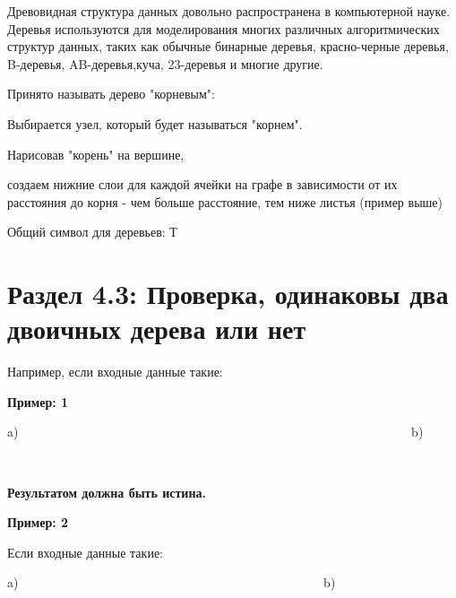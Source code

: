 \vspace{\baselineskip}
Древовидная структура данных довольно распространена в компьютерной науке. Деревья используются для моделирования многих различных алгоритмических структур данных, таких как обычные бинарные деревья, красно-черные деревья, B-деревья, AB-деревья,куча, 23-деревья и многие другие.

\vspace{\baselineskip}
Принято называть дерево "корневым":

\vspace{\baselineskip}
\begin{tcolorbox}
Выбирается {\color{Purple}{один}} узел, который будет называться "корнем". 

Нарисовав "корень" на вершине, 

создаем нижние слои для каждой ячейки на графе в зависимости от их расстояния до корня - чем больше расстояние, тем ниже листья (пример выше)
\end{tcolorbox}


\vspace{\baselineskip}
Общий символ для деревьев: Т

\section*{Раздел 4.3: Проверка, одинаковы два двоичных дерева или нет}

\vspace{\baselineskip}
Например, если входные данные такие:

\vspace{\baselineskip}
{\bfseries Пример: 1}

\vspace{\baselineskip}
a) \ \ \ \ \ \ \ \ \ \ \ \ \ \ \ \ \ \ \ \ \ \ \ \ \ \ \ \ \ \ \ \ \ \ \ \ \ \ \ \ \ \ \ \ \ \ \ \ \ \ \ \ \ \ \ \ \ \ \ \ \ \ b)
 
 \ \ \ \ \ 

{\bfseries Результатом должна быть истина.}

\newpage
{\bfseries Пример: 2}

\vspace{\baselineskip}
Если входные данные такие:

\vspace{\baselineskip}
a) \ \ \ \ \ \ \ \ \ \ \ \ \ \ \ \ \ \ \ \ \ \ \ \ \ \ \ \ \ \ \ \ \ \ \ \ \ \ \ \ \ \ \ \ \ \ \ \  b)

 \ \ \ \ \ 

